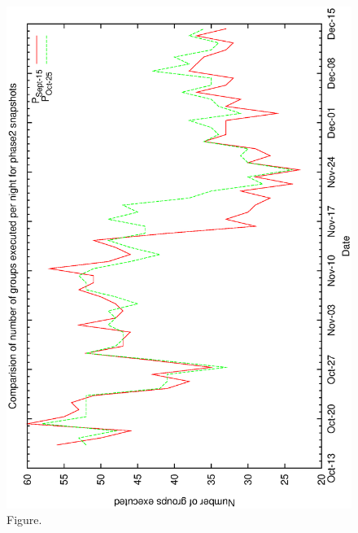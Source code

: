 \documentclass[12pt,a4paper]{article}
\begin{document}
\begin{figure}[htbp]
 \begin{center}
  \includegraphics[scale=1.0, angle=0]{figures/c60_odb_ng.eps}
 \end{center}
  \caption[Figure.]
{Figure.}
\end{figure}
\clearpage
\end{document}
